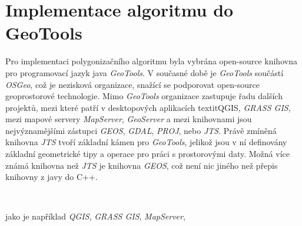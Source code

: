 \chapter{Implementace algoritmu do GeoTools}
	Pro implementaci polygonizačního algoritmu byla vybrána open-source knihovna pro programovací jazyk java \textit{GeoTools}. V současné době je \textit{GeoTools} součástí \textit{OSGeo}, což je nezisková organizace, snažící se podporovat open-source geoprostorové technologie. Mimo \textit{GeoTools} organizace zastupuje řadu dalších projektů, mezi které patří v desktopových aplikacích textit{QGIS}, \textit{GRASS GIS}, mezi mapové servery \textit{MapServer}, \textit{GeoServer} a mezi knihovnami jsou nejvýznamějšími zástupci \textit{GEOS}, \textit{GDAL}, \textit{PROJ}, nebo \textit{JTS}. Právě zmíněná knihovna \textit{JTS} tvoří základní kámen pro \textit{GeoTools}, jelikož jsou v ní definovány základní geometrické tipy a operace pro práci s prostorovými daty. Možná více známá knihovna než \textit{JTS} je knihovna \textit{GEOS}, což není nic jiného než přepis knihovny z javy do C++.
	
	
\
	
	
	jako je například \textit{QGIS}, \textit{GRASS GIS}, \textit{MapServer},

	

